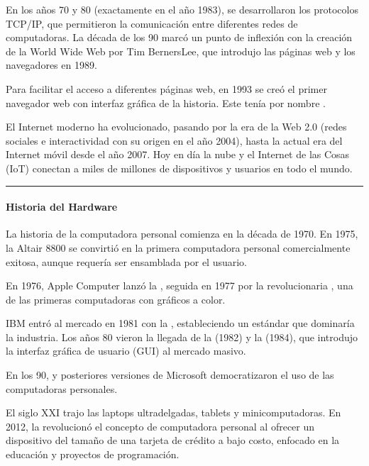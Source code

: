 \documentclass[letterpaper,10pt,spanish]{sphinxmanual}
\begin{document}
\sphinxAtStartPar
En los años 70 y 80 (exactamente en el año 1983), se desarrollaron los protocolos TCP/IP, que permitieron la comunicación entre diferentes redes de computadoras. La década de los 90 marcó un punto de inflexión con la creación de la World Wide Web por Tim Berners\sphinxhyphen{}Lee, que introdujo las páginas web y los navegadores en 1989.

\sphinxAtStartPar
Para facilitar el acceso a diferentes páginas web, en 1993 se creó el primer navegador web con interfaz gráfica de la historia. Este tenía por nombre .

\sphinxAtStartPar
El Internet moderno ha evolucionado, pasando por la era de la Web 2.0 (redes sociales e interactividad con su origen en el año 2004), hasta la actual era del Internet móvil desde el año 2007. Hoy en día la nube y el Internet de las Cosas (IoT) conectan a miles de millones de dispositivos y usuarios en todo el mundo.


\bigskip\hrule\bigskip



\paragraph{Historia del Hardware}
\label{\detokenize{cursos/informatica10/periodo01/R01:historia-del-hardware}}
\sphinxAtStartPar
La historia de la computadora personal comienza en la década de 1970. En 1975, la Altair 8800 se convirtió en la primera computadora personal comercialmente exitosa, aunque requería ser ensamblada por el usuario.

\sphinxAtStartPar
En 1976, Apple Computer lanzó la , seguida en 1977 por la revolucionaria , una de las primeras computadoras con gráficos a color.

\sphinxAtStartPar
IBM entró al mercado en 1981 con la , estableciendo un estándar que dominaría la industria. Los años 80 vieron la llegada de la  (1982) y la  (1984), que introdujo la interfaz gráfica de usuario (GUI) al mercado masivo.

\sphinxAtStartPar
En los 90,  y posteriores versiones de Microsoft democratizaron el uso de las computadoras personales.

\sphinxAtStartPar
El siglo XXI trajo las laptops ultra\sphinxhyphen{}delgadas, tablets y mini\sphinxhyphen{}computadoras. En 2012, la  revolucionó el concepto de computadora personal al ofrecer un dispositivo del tamaño de una tarjeta de crédito a bajo costo, enfocado en la educación y proyectos de programación.
\end{document}
